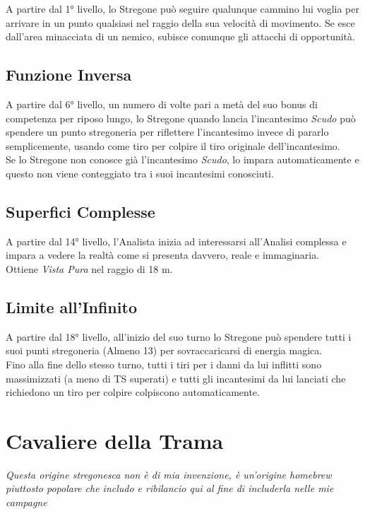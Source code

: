 A partire dal 1° livello, lo Stregone può seguire qualunque cammino lui voglia per arrivare in un punto qualsiasi nel raggio della sua velocità di movimento. Se esce dall'area minacciata di un nemico, subisce comunque gli attacchi di opportunità.

\subsection{Funzione Inversa}

A partire dal 6° livello, un numero di volte pari a metà del suo bonus di competenza per riposo lungo, lo Stregone quando lancia l'incantesimo \textit{Scudo} può spendere un punto stregoneria per riflettere l'incantesimo invece di pararlo semplicemente, usando come tiro per colpire il tiro originale dell'incantesimo. \\ Se lo Stregone non conosce già l'incantesimo \textit{Scudo}, lo impara automaticamente e questo non viene conteggiato tra i suoi incantesimi conosciuti.

\subsection{Superfici Complesse}

A partire dal 14° livello, l'Analista inizia ad interessarsi all'Analisi complessa e impara a vedere la realtà come si presenta davvero, reale e immaginaria. \\ Ottiene \textit{Vista Pura} nel raggio di 18 m.

\subsection{Limite all'Infinito}

A partire dal 18° livello, all'inizio del suo turno lo Stregone può spendere tutti i suoi punti stregoneria (Almeno 13) per sovraccaricarsi di energia magica. \\ Fino alla fine dello stesso turno, tutti i tiri per i danni da lui inflitti sono massimizzati (a meno di TS superati) e tutti gli incantesimi da lui lanciati che richiedono un tiro per colpire colpiscono automaticamente.

\section{Cavaliere della Trama}
\textit{Questa origine stregonesca non è di mia invenzione, è un'origine homebrew piuttosto popolare che includo e ribilancio qui al fine di includerla nelle mie campagne}

